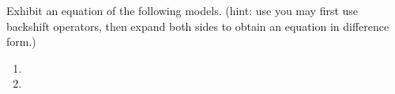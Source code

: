 Exhibit an equation of the following models. (hint: use you may first use backshift operators,
then expand both sides to obtain an equation in difference form.)
\begin{enumerate}[label=(\alph*)]
    \item 
    \item 
\end{enumerate}